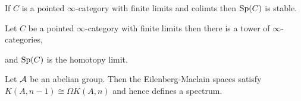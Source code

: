 \documentclass[12pt]{article}
\begin{document}
\begin{prop}
If $C$ is a pointed $\infty$-category with finite limits and colimts then $\mathrm{Sp}(C)$ is stable. 
\end{prop}

\begin{prop}
Let $C$ be a pointed $\infty$-category with finite limits then there is a tower of $\infty$-categories,
\begin{center}
\end{center}
and $\mathrm{Sp}(C)$ is the homotopy limit. 
\end{prop}

Let $\mathcal{A}$ be an abelian group. Then the Eilenberg-Maclain spaces satisfy $K(A, n-1) \cong \Omega K(A, n)$ and hence defines a spectrum. 
\end{document}
